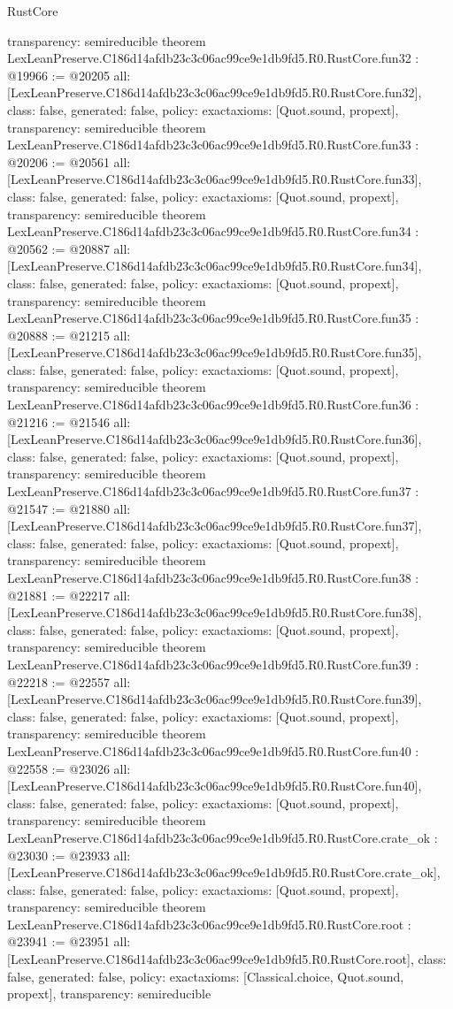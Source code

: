 \begin{lexlean}{RustCore}
\begin{coremodule}
{  transparency: semireducible
}
theorem LexLeanPreserve.C186d14afdb23c3c06ac99ce9e1db9fd5.R0.RustCore.fun32 : @19966 := @20205 {
  all: [LexLeanPreserve.C186d14afdb23c3c06ac99ce9e1db9fd5.R0.RustCore.fun32],
  class: false,
  generated: false,
  policy: exact{axioms: [Quot.sound, propext]},
  transparency: semireducible
}
theorem LexLeanPreserve.C186d14afdb23c3c06ac99ce9e1db9fd5.R0.RustCore.fun33 : @20206 := @20561 {
  all: [LexLeanPreserve.C186d14afdb23c3c06ac99ce9e1db9fd5.R0.RustCore.fun33],
  class: false,
  generated: false,
  policy: exact{axioms: [Quot.sound, propext]},
  transparency: semireducible
}
theorem LexLeanPreserve.C186d14afdb23c3c06ac99ce9e1db9fd5.R0.RustCore.fun34 : @20562 := @20887 {
  all: [LexLeanPreserve.C186d14afdb23c3c06ac99ce9e1db9fd5.R0.RustCore.fun34],
  class: false,
  generated: false,
  policy: exact{axioms: [Quot.sound, propext]},
  transparency: semireducible
}
theorem LexLeanPreserve.C186d14afdb23c3c06ac99ce9e1db9fd5.R0.RustCore.fun35 : @20888 := @21215 {
  all: [LexLeanPreserve.C186d14afdb23c3c06ac99ce9e1db9fd5.R0.RustCore.fun35],
  class: false,
  generated: false,
  policy: exact{axioms: [Quot.sound, propext]},
  transparency: semireducible
}
theorem LexLeanPreserve.C186d14afdb23c3c06ac99ce9e1db9fd5.R0.RustCore.fun36 : @21216 := @21546 {
  all: [LexLeanPreserve.C186d14afdb23c3c06ac99ce9e1db9fd5.R0.RustCore.fun36],
  class: false,
  generated: false,
  policy: exact{axioms: [Quot.sound, propext]},
  transparency: semireducible
}
theorem LexLeanPreserve.C186d14afdb23c3c06ac99ce9e1db9fd5.R0.RustCore.fun37 : @21547 := @21880 {
  all: [LexLeanPreserve.C186d14afdb23c3c06ac99ce9e1db9fd5.R0.RustCore.fun37],
  class: false,
  generated: false,
  policy: exact{axioms: [Quot.sound, propext]},
  transparency: semireducible
}
theorem LexLeanPreserve.C186d14afdb23c3c06ac99ce9e1db9fd5.R0.RustCore.fun38 : @21881 := @22217 {
  all: [LexLeanPreserve.C186d14afdb23c3c06ac99ce9e1db9fd5.R0.RustCore.fun38],
  class: false,
  generated: false,
  policy: exact{axioms: [Quot.sound, propext]},
  transparency: semireducible
}
theorem LexLeanPreserve.C186d14afdb23c3c06ac99ce9e1db9fd5.R0.RustCore.fun39 : @22218 := @22557 {
  all: [LexLeanPreserve.C186d14afdb23c3c06ac99ce9e1db9fd5.R0.RustCore.fun39],
  class: false,
  generated: false,
  policy: exact{axioms: [Quot.sound, propext]},
  transparency: semireducible
}
theorem LexLeanPreserve.C186d14afdb23c3c06ac99ce9e1db9fd5.R0.RustCore.fun40 : @22558 := @23026 {
  all: [LexLeanPreserve.C186d14afdb23c3c06ac99ce9e1db9fd5.R0.RustCore.fun40],
  class: false,
  generated: false,
  policy: exact{axioms: [Quot.sound, propext]},
  transparency: semireducible
}
theorem LexLeanPreserve.C186d14afdb23c3c06ac99ce9e1db9fd5.R0.RustCore.crate_ok : @23030 := @23933 {
  all: [LexLeanPreserve.C186d14afdb23c3c06ac99ce9e1db9fd5.R0.RustCore.crate_ok],
  class: false,
  generated: false,
  policy: exact{axioms: [Quot.sound, propext]},
  transparency: semireducible
}
theorem LexLeanPreserve.C186d14afdb23c3c06ac99ce9e1db9fd5.R0.RustCore.root : @23941 := @23951 {
  all: [LexLeanPreserve.C186d14afdb23c3c06ac99ce9e1db9fd5.R0.RustCore.root],
  class: false,
  generated: false,
  policy: exact{axioms: [Classical.choice, Quot.sound, propext]},
  transparency: semireducible
}


\end{coremodule}
\end{lexlean}
